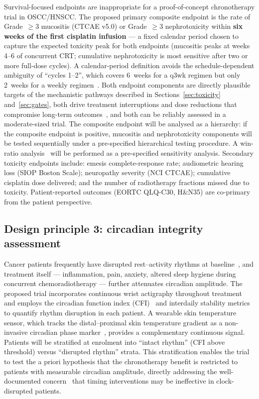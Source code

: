 \documentclass[preprint,review,12pt]{elsarticle}
\begin{document}
Survival-focused endpoints are inappropriate for a proof-of-concept
chronotherapy trial in OSCC/HNSCC.  The proposed primary composite endpoint is the rate of Grade~$\geq$3
mucositis (CTCAE v5.0) or Grade~$\geq$3 nephrotoxicity within
\textbf{six weeks of the first cisplatin infusion} --- a fixed calendar
period chosen to capture the expected toxicity peak for both endpoints
(mucositis peaks at weeks 4--6 of concurrent CRT; cumulative nephrotoxicity
is most sensitive after two or more full-dose cycles).  A calendar-period
definition avoids the schedule-dependent ambiguity of ``cycles 1--2'', which
covers 6~weeks for a q3wk regimen but only 2~weeks for a weekly
regimen~\cite{Kiyota2022}.  Both endpoint components are directly plausible
targets of the mechanistic pathways described in
Sections~\ref{sec:toxicity} and~\ref{sec:gates}, both drive treatment
interruptions and dose reductions that compromise long-term
outcomes~\cite{Szturz2017}, and both can be reliably assessed in a
moderate-sized trial.  The composite endpoint will be analysed as a
hierarchy: if the composite endpoint is positive, mucositis and nephrotoxicity
components will be tested sequentially under a pre-specified hierarchical
testing procedure.  A win-ratio analysis~\cite{Pocock2012} will be performed
as a pre-specified sensitivity analysis.  Secondary toxicity endpoints include:
emesis complete-response rate; audiometric hearing loss (SIOP Boston
Scale); neuropathy severity (NCI CTCAE); cumulative cisplatin dose
delivered; and the number of radiotherapy fractions missed due to
toxicity.  Patient-reported outcomes (EORTC QLQ-C30, H\&N35)
are co-primary from the patient perspective.

\subsection{Design principle 3: circadian integrity assessment}

Cancer patients frequently have disrupted rest--activity rhythms at
baseline~\cite{Mormont2000, Mormont2003}, and treatment itself --- inflammation, pain, anxiety, altered sleep hygiene during concurrent
chemoradiotherapy --- further attenuates circadian amplitude.  The
proposed trial incorporates continuous wrist actigraphy throughout
treatment and employs the circadian function index
(CFI)~\cite{OrtizTudela2016} and interdaily stability metrics to
quantify rhythm disruption in each patient.  A wearable skin
temperature sensor, which tracks the distal--proximal skin temperature
gradient as a non-invasive circadian phase marker~\cite{Liu2025wearable},
provides a complementary continuous signal.  Patients will be
stratified at enrolment into ``intact rhythm'' (CFI above threshold)
versus ``disrupted rhythm'' strata.  This stratification enables
the trial to test the a priori hypothesis that the chronotherapy
benefit is restricted to patients with measurable circadian amplitude,
directly addressing the well-documented concern~\cite{Mormont2000,
Innominato2014} that timing interventions may be ineffective in
clock-disrupted patients.
\end{document}
